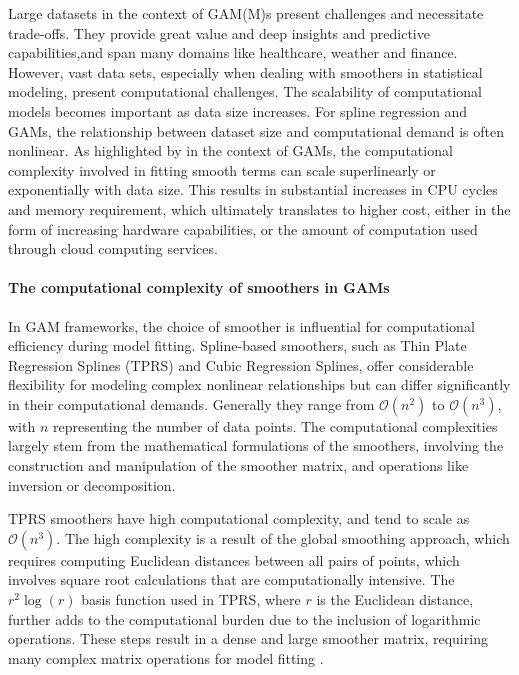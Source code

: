 \documentclass[12pt, twoside,hidelinks]{article}
\theoremstyle{definition}
\numberwithin{equation}{section}
\begin{document}
Large datasets in the context of GAM(M)s present challenges and necessitate trade-offs. They provide great value and deep insights and predictive capabilities,and span many domains like healthcare, weather and finance. However, vast data sets, especially when dealing with smoothers in statistical modeling, present computational challenges. The scalability of computational models becomes important as data size increases. For spline regression and GAMs, the relationship between dataset size and computational demand is often nonlinear. As highlighted by \citet{wood2017} in the context of GAMs, the computational complexity involved in fitting smooth terms can scale superlinearly or exponentially with data size. This results in substantial increases in CPU cycles and memory requirement, which ultimately translates to higher cost, either in the form of increasing hardware capabilities, or the amount of computation used through cloud computing services.
\newline

\paragraph{The computational complexity of smoothers in GAMs}
In GAM frameworks, the choice of smoother is influential for computational efficiency during model fitting. Spline-based smoothers, such as Thin Plate Regression Splines (TPRS) and Cubic Regression Splines, offer considerable flexibility for modeling complex nonlinear relationships but can differ significantly in their computational demands. Generally they range from $\mathcal{O}(n^2)$ to $\mathcal{O}(n^3)$, with $n$ representing the number of data points. The computational complexities largely stem from the mathematical formulations of the smoothers, involving the construction and manipulation of the smoother matrix, and operations like inversion or decomposition.

TPRS smoothers have high computational complexity, and tend to scale as $\mathcal{O}(n^3)$. The high complexity is a result of the global smoothing approach, which requires computing Euclidean distances between all pairs of points, which involves square root calculations that are computationally intensive. The $r^2 \log(r)$ basis function used in TPRS, where $r$ is the Euclidean distance, further adds to the computational burden due to the inclusion of logarithmic operations. These steps result in a dense and large smoother matrix, requiring many complex matrix operations for model fitting .
\end{document}
